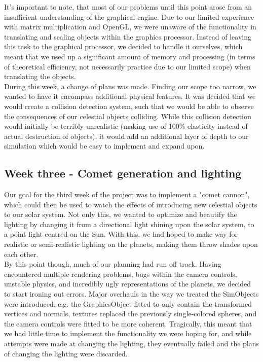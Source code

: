 It's important to note, that most of our problems until this point arose from an insufficient understanding of the graphical engine. Due to our limited experience with matrix multiplication and OpenGL, we were unaware of the functionality in translating and scaling objects within the graphics processor. Instead of leaving this task to the graphical processor, we decided to handle it ourselves, which meant that we used up a significant amount of memory and processing (in terms of theoretical efficiency, not necessarily practice due to our limited scope) when translating the objects.\\

During this week, a change of plans was made. Finding our scope too narrow, we wanted to have it encompass additional physical features. It was decided that we would create a collision detection system, such that we would be able to observe the consequences of our celestial objects colliding. While this collision detection would initially be terribly unrealistic (making use of 100\% elasticity instead of actual destruction of objects), it would add an additional layer of depth to our simulation which would be easy to implement and expand upon.

\subsection{Week three - Comet generation and lighting}
Our goal for the third week of the project was to implement a "comet cannon", which could then be used to watch the effects of introducing new celestial objects to our solar system. Not only this, we wanted to optimize and beautify the lighting by changing it from a directional light shining upon the solar system, to a point light centred on the Sun. With this, we had hoped to make way for realistic or semi-realistic lighting on the planets, making them throw shades upon each other.\\

By this point though, much of our planning had run off track. Having encountered multiple rendering problems, bugs within the camera controls, unstable physics, and incredibly ugly representations of the planets, we decided to start ironing out errors. Major overhauls in the way we treated the SimObjects were introduced, e.g. the GraphicsObject fitted to only contain the transformed vertices and normals, textures replaced the previously single-colored spheres, and the camera controls were fitted to be more coherent. Tragically, this meant that we had little time to implement the functionality we were hoping for, and while attempts were made at changing the lighting, they eventually failed and the plans of changing the lighting were discarded.\\

